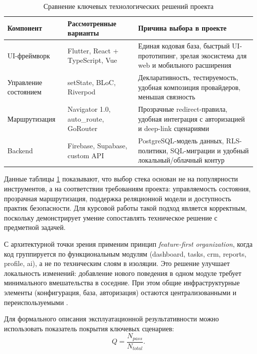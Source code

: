 \begin{table}[h!]
\caption{Сравнение ключевых технологических решений проекта}
\centering
\begin{tabular}{|p{4cm}|p{4.5cm}|p{5.7cm}|}
\hline
\textbf{Компонент} & \textbf{Рассмотренные варианты} & \textbf{Причина выбора в проекте} \\
\hline
UI-фреймворк & Flutter, React + TypeScript, Vue & Единая кодовая база, быстрый UI-прототипинг, зрелая экосистема для web и мобильного расширения \cite{flutterDocs} \\
\hline
Управление состоянием & setState, BLoC, Riverpod & Декларативность, тестируемость, удобная композиция провайдеров, меньшая связность \cite{riverpodDocs} \\
\hline
Маршрутизация & Navigator 1.0, auto\_route, GoRouter & Прозрачные redirect-правила, удобная интеграция с авторизацией и deep-link сценариями \cite{goRouterDocs} \\
\hline
Backend & Firebase, Supabase, custom API & PostgreSQL-модель данных, RLS-политики, SQL-миграции и удобный локальный/облачный контур \cite{supabaseDocs,postgresDocs} \\
\hline
\end{tabular}
\label{tab:tech-comparison}
\end{table}

Данные таблицы \ref{tab:tech-comparison} показывают, что выбор стека основан не на популярности инструментов, а на соответствии требованиям проекта: управляемость состояния, прозрачная маршрутизация, поддержка реляционной модели и доступность практик безопасности. Для курсовой работы такой подход является корректным, поскольку демонстрирует умение сопоставлять техническое решение с предметной задачей.

С архитектурной точки зрения применим принцип \textit{feature-first organization}, когда код группируется по функциональным модулям (dashboard, tasks, crm, reports, profile, ai), а не по техническим слоям в изоляции. Это решение улучшает локальность изменений: добавление нового поведения в одном модуле требует минимального вмешательства в соседние. При этом общие инфраструктурные элементы (конфигурация, база, авторизация) остаются централизованными и переиспользуемыми \cite{repoReadme,patternsBook}.

Для формального описания эксплуатационной результативности можно использовать показатель покрытия ключевых сценариев:
\begin{equation}
Q = \frac{N_{pass}}{N_{total}}.
\label{eq:quality}
\end{equation}

